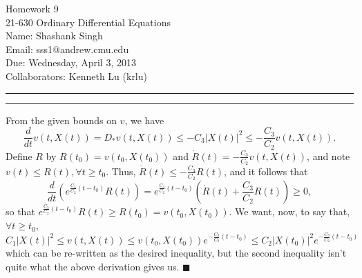 \documentclass[11pt]{article}
\makeatletter
\newcounter{questionCounter}
\newcounter{partCounter}[questionCounter]
\newenvironment{question}[2][\arabic{questionCounter}]{%
    \setcounter{partCounter}{0}%
    \vspace{.25in} \hrule \vspace{0.5em}%
        \noindent{\bf #2}%
    \vspace{0.8em} \hrule \vspace{.10in}%
    \addtocounter{questionCounter}{1}%
}{}
\newcommand{\myname}{Shashank Singh}
\newcommand{\myandrew}{sss1@andrew.cmu.edu}
\newcommand{\myclass}{21-630 Ordinary Differential Equations}
\newcommand{\myhwnum}{9}
\newcommand{\duedate}{Wednesday, April 3, 2013}
\newcommand{\mycollaborators}{Kenneth Lu (krlu)}
\renewcommand{\qed}{\quad $\blacksquare$}
\makeatother
\begin{document}
\thispagestyle{plain}

{\Large Homework \myhwnum} \\
\myclass            \\
Name: \myname       \\
Email: \myandrew    \\
Due: \duedate       \\
Collaborators: \mycollaborators

\begin{question}{Problem 1}
From the given bounds on $v$, we have
\[\frac{d}{dt} v(t,X(t))
    = D_*v(t,X(t))
    \leq -C_3 |X(t)|^2
    \leq -\frac{C_3}{C_2} v(t,X(t)).
\]
Define $R$ by $R(t_0) = v(t_0,X(t_0))$ and
$\dot R(t) = -\frac{C_3}{C_2} v(t,X(t))$, and note
$v(t) \leq R(t), \forall t \geq t_0$. Thus,
$\dot R(t) \leq -\frac{C_3}{C_2} R(t)$, and it follows that
\[\frac{d}{dt} \left( e^{\frac{C_3}{C_2} (t - t_0)} R(t) \right)
    = e^{\frac{C_3}{C_2} (t - t_0)} (\dot R(t) + \frac{C_3}{C_2} R(t))
    \geq 0,
\]
so that $e^{\frac{C_3}{C_2} (t - t_0)} R(t) \geq R(t_0) = v(t_0,X(t_0))$.
We want, now, to say that, $\forall t \geq t_0$,
\[C_1 |X(t)|^2
    \leq v(t,X(t))
    \leq v(t_0,X(t_0)) e^{-\frac{C_3}{C_2} (t - t_0)} 
    \leq C_2|X(t_0)|^2 e^{-\frac{C_3}{C_2} (t - t_0)}
\]
which can be re-written as the desired inequality, but the second inequality
isn't quite what the above derivation gives us. \qed
\end{question}
\end{document}
